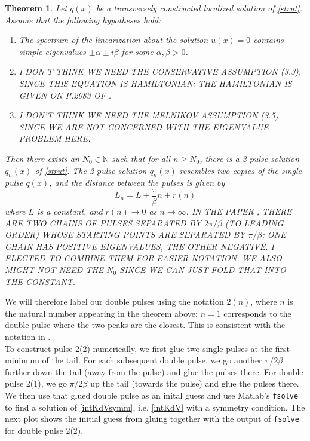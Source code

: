 \documentclass[12pt]{article}
\def\N{{\mathbb N}}
\newtheorem{theorem}{Theorem}
\begin{document}
\begin{theorem}
Let $q(x)$ be a transversely constructed localized solution of \eqref{strut}. Assume that the following hypotheses hold:
\begin{enumerate}
	\item The spectrum of the linearization about the solution $u(x) = 0$ contains simple eigenvalues $\pm \alpha \pm i \beta$ for some $\alpha, \beta > 0$.
	\item I DON'T THINK WE NEED THE CONSERVATIVE ASSUMPTION (3.3), SINCE THIS EQUATION IS HAMILTONIAN; THE  HAMILTONIAN IS GIVEN ON P.2083 OF \cite{Sandstede1997}.
	\item I DON'T THINK WE NEED THE MELNIKOV ASSUMPTION (3.5) SINCE WE ARE NOT CONCERNED WITH THE EIGENVALUE PROBLEM HERE.
\end{enumerate}
Then there exists an $N_0 \in \N$ such that for all $n \geq N_0$, there is a 2-pulse solution $q_n(x)$ of \eqref{strut}. The 2-pulse solution $q_n(x)$ resembles two copies of the single pulse $q(x)$, and the distance between the pulses is given by
\begin{equation}\label{pulsedistance}
L_n = L + \frac{\pi}{\beta}n + r(n)
\end{equation}
where $L$ is a constant, and $r(n) \rightarrow 0$ as $n \rightarrow \infty$. IN THE PAPER \cite{Sandstede1997}, THERE ARE TWO CHAINS OF PULSES SEPARATED BY $2 \pi / \beta$ (TO LEADING ORDER) WHOSE STARTING POINTS ARE SEPARATED BY $\pi / \beta$; ONE CHAIN HAS POSITIVE EIGENVALUES, THE OTHER NEGATIVE. I ELECTED TO COMBINE THEM FOR EASIER NOTATION. WE ALSO MIGHT NOT NEED THE $N_0$ SINCE WE CAN JUST FOLD THAT INTO THE CONSTANT.
\end{theorem}

We will therefore label our double pulses using the notation $2(n)$, where $n$ is the natural number appearing in the theorem above; $n = 1$ corresponds to the double pulse where the two peaks are the closest. This is consistent with the notation in \cite{Champneys1993}.\\

To construct pulse 2(2) numerically, we first glue two single pulses at the first minimum of the tail. For each subsequent double pulse, we go another $\pi / 2 \beta$ further down the tail (away from the pulse) and glue the pulses there. For double pulse 2(1), we go $\pi / 2 \beta$ up the tail (towards the pulse) and glue the pulses there. We then use that glued double pulse as an inital guess and use Matlab's \texttt{fsolve} to find a solution of \eqref{intKdVsymm}, i.e. \eqref{intKdV} with a symmetry condition. The next plot shows the initial guess from gluing together with the output of \texttt{fsolve} for double pulse 2(2).
\end{document}
